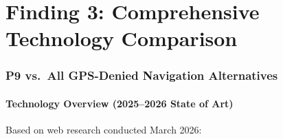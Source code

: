 \documentclass[11pt]{article}
\theoremstyle{definition}
\theoremstyle{remark}
\begin{document}
\part{Finding 3: Comprehensive Technology Comparison}
\label{part:comparison}

\section{P9 vs.\ All GPS-Denied Navigation Alternatives}
\label{sec:comparison}

\subsection{Technology Overview (2025--2026 State of Art)}

Based on web research conducted March 2026:
\end{document}
